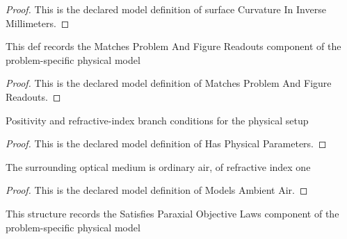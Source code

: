 \begin{proof}
  This is the declared model definition of surface Curvature In Inverse Millimeters.
\end{proof}
\begin{definition}
  \label{def:physics:phyx-mini-0057:phyxminiproblems-problemphyxmini0057-matchesproblemandfigurereadouts}
  This def records the Matches Problem And Figure Readouts component of the problem-specific physical model
\end{definition}
\begin{proof}
  This is the declared model definition of Matches Problem And Figure Readouts.
\end{proof}
\begin{definition}
  \label{def:physics:phyx-mini-0057:phyxminiproblems-problemphyxmini0057-hasphysicalparameters}
  Positivity and refractive-index branch conditions for the physical setup
\end{definition}
\begin{proof}
  This is the declared model definition of Has Physical Parameters.
\end{proof}
\begin{definition}
  \label{def:physics:phyx-mini-0057:phyxminiproblems-problemphyxmini0057-modelsambientair}
  The surrounding optical medium is ordinary air, of refractive index one
\end{definition}
\begin{proof}
  This is the declared model definition of Models Ambient Air.
\end{proof}
\begin{definition}
  \label{def:physics:phyx-mini-0057:phyxminiproblems-problemphyxmini0057-satisfiesparaxialobjectivelaws}
  This structure records the Satisfies Paraxial Objective Laws component of the problem-specific physical model
\end{definition}
